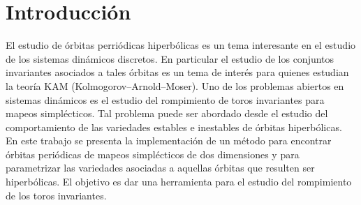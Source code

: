 
\chapter{Introducción}

El estudio de órbitas perri\'odicas hiperb\'olicas es un tema interesante en el estudio de los sistemas din\'amicos discretos. En particular el estudio de los conjuntos invariantes asociados a tales \'orbitas es un tema de inter\'es para quienes estudian la teor\'ia KAM (Kolmogorov–Arnold–Moser). Uno de los problemas abiertos en sistemas din\'amicos es el estudio del rompimiento de toros invariantes para mapeos simpl\'ecticos. Tal problema puede ser abordado desde el estudio del comportamiento de las variedades estables e inestables de \'orbitas hiperb\'olicas. \\

En este trabajo se presenta la implementaci\'on de un m\'etodo para encontrar \'orbitas peri\'odicas de mapeos simpl\'ecticos de dos dimensiones y para parametrizar las variedades asociadas a aquellas \'orbitas que resulten ser hiperb\'olicas. El objetivo es dar una herramienta para el estudio del rompimiento de los toros invariantes. 


